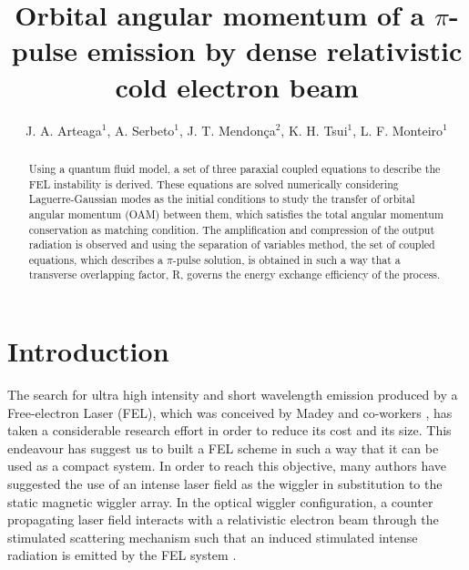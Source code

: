 \documentclass[aps,pra,preprint,showpacs,preprintnumbers,amsmath,amssymb]{revtex4-1}
\begin{document}
\title{Orbital angular momentum of a $\pi$-pulse emission by dense relativistic cold electron beam }
\author{J. A. Arteaga$^1$, A. Serbeto$^1$, J. T. Mendon\c{c}a$^2$, K. H. Tsui$^1$, L. F. Monteiro$^1$ }

\begin{abstract}

Using a quantum fluid model, a set of three paraxial coupled equations to describe the FEL instability is derived. These equations  are solved numerically considering Laguerre-Gaussian modes as the initial conditions to study the transfer of orbital angular momentum (OAM) between them, which satisfies the total angular momentum conservation as matching condition. The amplification and compression of the output radiation is observed and using the separation of variables method, the set of coupled equations, which describes a $\pi$-pulse solution, is obtained in such a way that a transverse overlapping factor, R, governs the energy exchange efficiency of the process.
\end{abstract}

\maketitle


\section{Introduction}


The search for ultra high intensity and short wavelength  emission produced by a Free-electron Laser  (FEL), which was conceived by Madey and co-workers \cite{madey1971},   has taken a considerable research effort in order to reduce its cost and its size.  This endeavour has suggest us to built a FEL scheme in such a way that it can be used as a compact system. In order to reach this objective, many authors have suggested the use of an intense laser field as the wiggler in substitution to the static magnetic wiggler array. In the optical wiggler configuration, a counter propagating laser field interacts with a relativistic electron beam through the stimulated scattering mechanism such that an induced stimulated intense radiation is emitted by the FEL system \cite{sprangle2009, Andriyash}.
\end{document}
